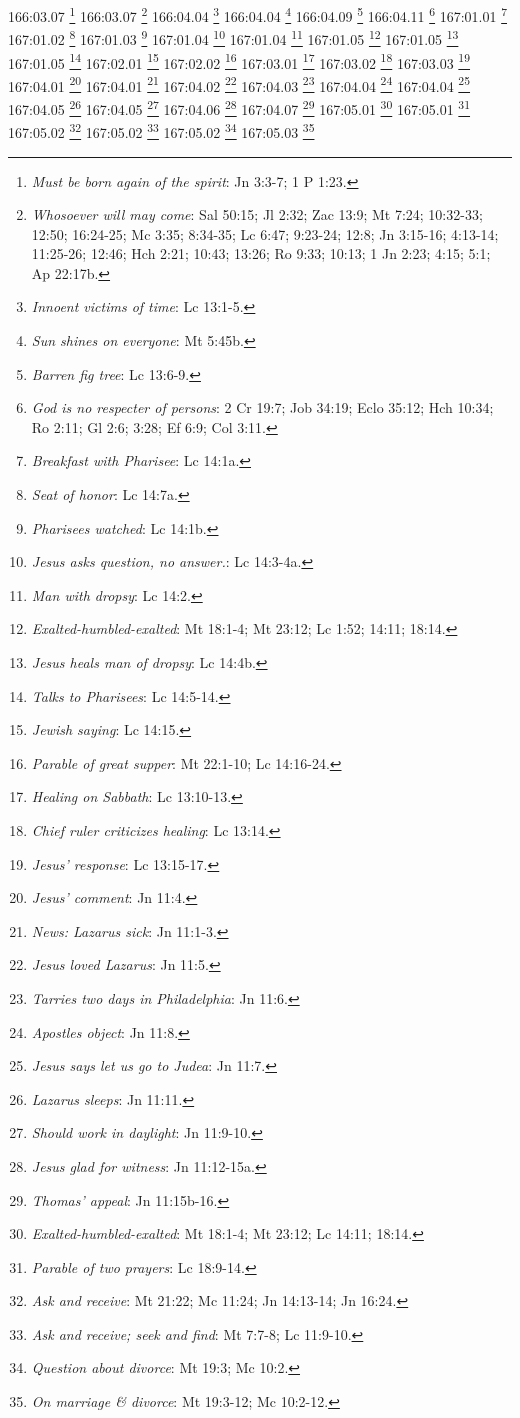 166:03.07 \footnote{\textit{Must be born again of the spirit}: Jn 3:3-7; 1 P 1:23.}
166:03.07 \footnote{\textit{Whosoever will may come}: Sal 50:15; Jl 2:32; Zac 13:9; Mt 7:24; 10:32-33; 12:50; 16:24-25; Mc 3:35; 8:34-35; Lc 6:47; 9:23-24; 12:8; Jn 3:15-16; 4:13-14; 11:25-26; 12:46; Hch 2:21; 10:43; 13:26; Ro 9:33; 10:13; 1 Jn 2:23; 4:15; 5:1; Ap 22:17b.}
166:04.04 \footnote{\textit{Innoent victims of time}: Lc 13:1-5.}
166:04.04 \footnote{\textit{Sun shines on everyone}: Mt 5:45b.}
166:04.09 \footnote{\textit{Barren fig tree}: Lc 13:6-9.}
166:04.11 \footnote{\textit{God is no respecter of persons}: 2 Cr 19:7; Job 34:19; Eclo 35:12; Hch 10:34; Ro 2:11; Gl 2:6; 3:28; Ef 6:9; Col 3:11.}
167:01.01 \footnote{\textit{Breakfast with Pharisee}: Lc 14:1a.}
167:01.02 \footnote{\textit{Seat of honor}: Lc 14:7a.}
167:01.03 \footnote{\textit{Pharisees watched}: Lc 14:1b.}
167:01.04 \footnote{\textit{Jesus asks question, no answer.}: Lc 14:3-4a.}
167:01.04 \footnote{\textit{Man with dropsy}: Lc 14:2.}
167:01.05 \footnote{\textit{Exalted-humbled-exalted}: Mt 18:1-4; Mt 23:12; Lc 1:52; 14:11; 18:14.}
167:01.05 \footnote{\textit{Jesus heals man of dropsy}: Lc 14:4b.}
167:01.05 \footnote{\textit{Talks to Pharisees}: Lc 14:5-14.}
167:02.01 \footnote{\textit{Jewish saying}: Lc 14:15.}
167:02.02 \footnote{\textit{Parable of great supper}: Mt 22:1-10; Lc 14:16-24.}
167:03.01 \footnote{\textit{Healing on Sabbath}: Lc 13:10-13.}
167:03.02 \footnote{\textit{Chief ruler criticizes healing}: Lc 13:14.}
167:03.03 \footnote{\textit{Jesus' response}: Lc 13:15-17.}
167:04.01 \footnote{\textit{Jesus' comment}: Jn 11:4.}
167:04.01 \footnote{\textit{News: Lazarus sick}: Jn 11:1-3.}
167:04.02 \footnote{\textit{Jesus loved Lazarus}: Jn 11:5.}
167:04.03 \footnote{\textit{Tarries two days in Philadelphia}: Jn 11:6.}
167:04.04 \footnote{\textit{Apostles object}: Jn 11:8.}
167:04.04 \footnote{\textit{Jesus says let us go to Judea}: Jn 11:7.}
167:04.05 \footnote{\textit{Lazarus sleeps}: Jn 11:11.}
167:04.05 \footnote{\textit{Should work in daylight}: Jn 11:9-10.}
167:04.06 \footnote{\textit{Jesus glad for witness}: Jn 11:12-15a.}
167:04.07 \footnote{\textit{Thomas' appeal}: Jn 11:15b-16.}
167:05.01 \footnote{\textit{Exalted-humbled-exalted}: Mt 18:1-4; Mt 23:12; Lc 14:11; 18:14.}
167:05.01 \footnote{\textit{Parable of two prayers}: Lc 18:9-14.}
167:05.02 \footnote{\textit{Ask and receive}: Mt 21:22; Mc 11:24; Jn 14:13-14; Jn 16:24.}
167:05.02 \footnote{\textit{Ask and receive; seek and find}: Mt 7:7-8; Lc 11:9-10.}
167:05.02 \footnote{\textit{Question about divorce}: Mt 19:3; Mc 10:2.}
167:05.03 \footnote{\textit{On marriage & divorce}: Mt 19:3-12; Mc 10:2-12.}
